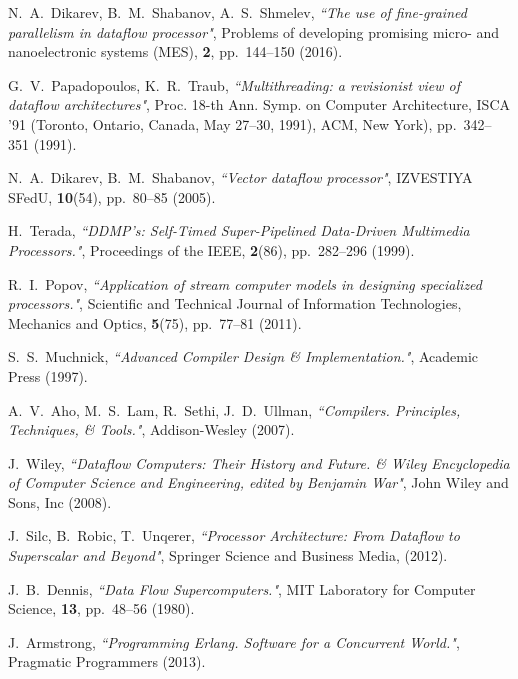 \documentclass[
11pt,%
tightenlines,%
twoside,%
onecolumn,%
nofloats,%
nobibnotes,%
nofootinbib,%
superscriptaddress,%
noshowpacs,%
centertags]%
{revtex4}
\begin{document}
\begin{thebibliography}{99}

N.~A.~Dikarev, B.~M.~Shabanov, A.~S.~Shmelev, {\it ``The use of fine-grained parallelism in dataflow processor"}, Problems of developing promising micro- and nanoelectronic systems (MES), {\bf 2}, pp.~144--150 (2016).

G.~V.~Papadopoulos, K.~R.~Traub, {\it ``Multithreading: a revisionist view of
dataflow architectures"}, Proc. 18-th Ann. Symp. on Computer Architecture,
ISCA ’91 (Toronto, Ontario, Canada, May 27–30, 1991), ACM, New York), pp.~342--351 (1991).

N.~A.~Dikarev, B.~M.~Shabanov, {\it ``Vector dataflow processor"}, IZVESTIYA SFedU, {\bf 10}(54), pp.~80--85 (2005).

H.~Terada, {\it ``DDMP’s: Self-Timed Super-Pipelined Data-Driven Multimedia Processors."}, Proceedings of the IEEE, {\bf 2}(86), pp.~282--296 (1999).

R.~I.~Popov, {\it ``Application of stream computer models in designing specialized processors."}, Scientific and Technical Journal of Information Technologies, Mechanics and Optics, {\bf 5}(75), pp.~77--81 (2011).

S.~S.~Muchnick, {\it ``Advanced Compiler Design \& Implementation."}, Academic Press (1997).

A.~V.~Aho, M.~S.~Lam, R.~Sethi, J.~D.~Ullman, {\it ``Compilers. Principles, Techniques, \& Tools."}, Addison-Wesley (2007).

J.~Wiley, {\it ``Dataflow Computers: Their History and Future. \& Wiley Encyclopedia of Computer Science and Engineering, edited by Benjamin War"}, John Wiley and Sons, Inc (2008).

J.~Silc, B.~Robic, T.~Unqerer, {\it ``Processor Architecture: From Dataflow to Superscalar and Beyond"}, Springer Science and Business Media, (2012).

J.~B.~Dennis, {\it ``Data Flow Supercomputers."}, MIT Laboratory for Computer Science, {\bf 13}, pp.~48--56 (1980).

J.~Armstrong, {\it ``Programming Erlang. Software for a Concurrent World."}, Pragmatic Programmers (2013).

\end{thebibliography}
\end{document}
